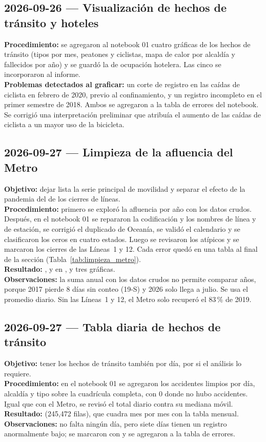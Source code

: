 \subsection{2026-09-26 --- Visualización de hechos de tránsito y hoteles}
\textbf{Procedimiento:} se agregaron al notebook 01 cuatro gráficas de los hechos de tránsito (tipos
por mes, peatones y ciclistas, mapa de calor por alcaldía y fallecidos por año) y se guardó la de
ocupación hotelera. Las cinco se incorporaron al informe.\\
\textbf{Problemas detectados al graficar:} un corte de registro en las caídas de ciclista en febrero
de 2020, previo al confinamiento, y un registro incompleto en el primer semestre de 2018. Ambos se
agregaron a la tabla de errores del notebook. Se corrigió una interpretación preliminar que atribuía
el aumento de las caídas de ciclista a un mayor uso de la bicicleta.

\subsection{2026-09-27 --- Limpieza de la afluencia del Metro}
\textbf{Objetivo:} dejar lista la serie principal de movilidad y separar el efecto de la pandemia del
de los cierres de líneas.\\
\textbf{Procedimiento:} primero se exploró la afluencia por año con los datos crudos. Después, en el
notebook 01 se repararon la codificación y los nombres de línea y de estación, se corrigió el duplicado
de Oceanía, se validó el calendario y se clasificaron los ceros en cuatro estados. Luego se revisaron
los atípicos y se marcaron los cierres de las Líneas~1 y 12. Cada error quedó en una tabla al final de
la sección (Tabla~\ref{tab:limpieza_metro}).\\
\textbf{Resultado:} ,  y  en
, y tres gráficas.\\
\textbf{Observaciones:} la suma anual con los datos crudos no permite comparar años, porque 2017
pierde 8 días sin conteo (19-S) y 2026 solo llega a julio. Se usa el promedio diario. Sin las
Líneas~1 y 12, el Metro solo recuperó el 83\,\% de 2019.

\subsection{2026-09-27 --- Tabla diaria de hechos de tránsito}
\textbf{Objetivo:} tener los hechos de tránsito también por día, por si el análisis lo requiere.\\
\textbf{Procedimiento:} en el notebook 01 se agregaron los accidentes limpios por día, alcaldía y
tipo sobre la cuadrícula completa, con 0 donde no hubo accidentes. Igual que con el Metro, se revisó
el total diario contra su mediana móvil.\\
\textbf{Resultado:}  (245,472 filas), que cuadra mes por mes con la
tabla mensual.\\
\textbf{Observaciones:} no falta ningún día, pero siete días tienen un registro anormalmente bajo;
se marcaron con  y se agregaron a la tabla de errores.

